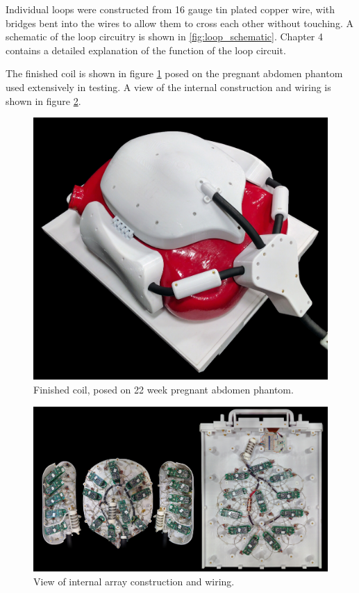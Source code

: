 Individual loops were constructed from 16 gauge tin plated copper wire, with bridges bent into the wires to allow them
to cross each other without touching. A schematic of the loop circuitry is shown in \ref{fig:loop_schematic}. Chapter 4
contains a detailed explanation of the function of the loop circuit.

The finished coil is shown in figure \ref{fig:assembled_view} posed on the pregnant abdomen phantom used extensively
in testing. A view of the internal construction and wiring is shown in figure \ref{fig:internals_composite}.

\begin{figure}
\includegraphics[width=6in]{figures/assembled_view.jpg}
\caption{Finished coil, posed on 22 week pregnant abdomen phantom.}
\label{fig:assembled_view}
\end{figure}

\begin{figure}
\includegraphics[width=6in]{figures/internals_composite.jpg}
\caption{View of internal array construction and wiring.}
\label{fig:internals_composite}
\end{figure}

